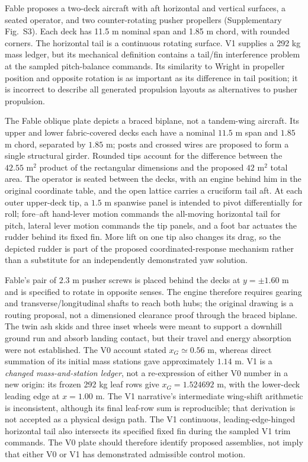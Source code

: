 \documentclass[10pt,letterpaper]{article}
\begin{document}
Fable proposes a two-deck aircraft with aft horizontal and vertical surfaces, a seated operator, and two counter-rotating pusher propellers (Supplementary Fig.~S3). Each deck has 11.5 m nominal span and 1.85 m chord, with rounded corners. The horizontal tail is a continuous rotating surface. V1 supplies a 292 kg mass ledger, but its mechanical definition contains a tail/fin interference problem at the sampled pitch-balance commands. Its similarity to Wright in propeller position and opposite rotation is as important as its difference in tail position; it is incorrect to describe all generated propulsion layouts as alternatives to pusher propulsion.



The Fable oblique plate depicts a braced biplane, not a tandem-wing aircraft. Its upper and lower fabric-covered decks each have a nominal $11.5$ m span and $1.85$ m chord, separated by $1.85$ m; posts and crossed wires are proposed to form a single structural girder. Rounded tips account for the difference between the $42.55$ m$^2$ product of the rectangular dimensions and the proposed $42$ m$^2$ total area. The operator is seated between the decks, with an engine behind him in the original coordinate table, and the open lattice carries a cruciform tail aft. At each outer upper-deck tip, a $1.5$ m spanwise panel is intended to pivot differentially for roll; fore--aft hand-lever motion commands the all-moving horizontal tail for pitch, lateral lever motion commands the tip panels, and a foot bar actuates the rudder behind its fixed fin. More lift on one tip also changes its drag, so the depicted rudder is part of the proposed coordinated-response mechanism rather than a substitute for an independently demonstrated yaw solution.

Fable's pair of $2.3$ m pusher screws is placed behind the decks at $y=\pm1.60$ m and is specified to rotate in opposite senses. The engine therefore requires gearing and transverse/longitudinal shafts to reach both hubs; the original drawing is a routing proposal, not a dimensioned clearance proof through the braced biplane. The twin ash skids and three inset wheels were meant to support a downhill ground run and absorb landing contact, but their travel and energy absorption were not established. The V0 account stated $x_G\simeq0.56$ m, whereas direct summation of its initial mass stations gave approximately $1.14$ m. V1 is a \emph{changed mass-and-station ledger}, not a re-expression of either V0 number in a new origin: its frozen 292 kg leaf rows give $x_G=1.524692$ m, with the lower-deck leading edge at $x=1.00$ m. The V1 narrative's intermediate wing-shift arithmetic is inconsistent, although its final leaf-row sum is reproducible; that derivation is not accepted as a physical design path. The V1 continuous, leading-edge-hinged horizontal tail also intersects its specified fixed fin during the sampled V1 trim commands. The V0 plate should therefore identify proposed assemblies, not imply that either V0 or V1 has demonstrated admissible control motion.
\end{document}

